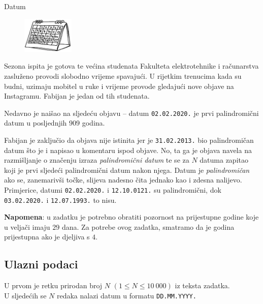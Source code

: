 \begin{statement}[
  problempoints=50,
  timelimit=1 sekunda,
  memorylimit=512 MiB,
]{Datum}

\setlength\intextsep{-0.1cm}
\begin{figure}
\centering
\includegraphics[width=0.22\textwidth]{img/datum.png}
\end{figure}

Sezona ispita je gotova te većina studenata Fakulteta elektrotehnike i
računarstva zasluženo provodi slobodno vrijeme spavajući. U rijetkim
trenucima kada su budni, uzimaju mobitel u ruke i vrijeme provode gledajući
nove objave na Instagramu. Fabijan je jedan od tih studenata.

Nedavno je naišao na sljedeću objavu -- datum \texttt{02.02.2020.} je prvi
palindromični datum u posljednjih $909$ godina.

Fabijan je zaključio da objava nije istinita jer je \texttt{31.02.2013.} bio
palindromičan datum što je i napisao u komentaru ispod objave. No, ta ga je
objava navela na razmišljanje o značenju izraza \textit{palindromični datum}
te se za $N$ datuma zapitao koji je prvi sljedeći palindromični datum nakon
njega. Datum je \textit{palindromičan} ako se, zanemarivši točke, slijeva nadesno čita
jednako kao i zdesna nalijevo. Primjerice, datumi \texttt{02.02.2020.} i
\texttt{12.10.0121.} su palindromični, dok \texttt{03.02.2020.} i
\texttt{12.07.1993.} to nisu.

\textbf{Napomena}: u zadatku je potrebno obratiti pozornost na prijestupne
godine koje u veljači imaju $29$ dana. Za potrebe ovog zadatka, smatramo da je
godina prijestupna ako je djeljiva s $4$.

\subsection*{Ulazni podaci}
U prvom je retku prirodan broj $N$ $(1 \le N \le 10\ 000)$ iz teksta zadatka.\\
U sljedećih se $N$ redaka nalazi datum u formatu \texttt{DD.MM.YYYY.}


\end{statement}
